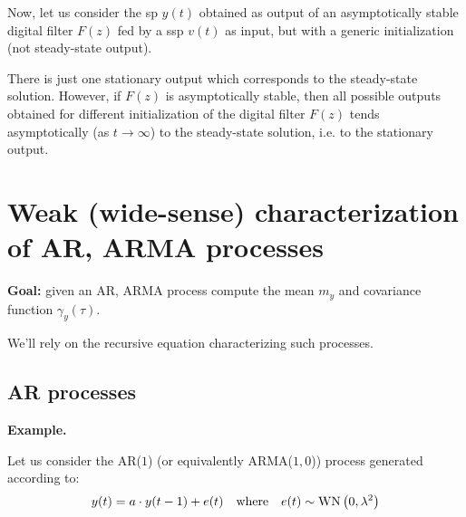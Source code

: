 Now, let us consider the \gls{sp} $y(t)$ obtained as output of an asymptotically stable digital filter $F(z)$ fed by a \gls{ssp} $v(t)$ as input, but with a generic initialization (not steady-state output).

\begin{figure}[htpb]
	\centering
\end{figure}
\FloatBarrier

\begin{theorem}
	There is just one stationary output which corresponds to the steady-state solution. However, if $F(z)$ is asymptotically stable, then all possible outputs obtained for different initialization of the digital filter $F(z)$ tends asymptotically (as $t \rightarrow \infty$) to the steady-state solution, i.e. to the stationary output.
\end{theorem}


\section{Weak (wide-sense) characterization of AR, ARMA processes}
\textbf{Goal:} given an AR, ARMA process compute the mean $m_y$ and covariance function $\gamma_y(\tau)$.


We'll rely on the recursive equation characterizing such processes.

\subsection{AR processes}
\textbf{Example.}

Let us consider the AR($1$) (or equivalently ARMA($1,0$)) process generated according to:
\begin{align*}
	y(t)=a \cdot y(t-1)+e(t) \quad \text{where} \quad e(t) \sim \operatorname{WN}\left(0, \lambda^{2}\right)
\end{align*}


